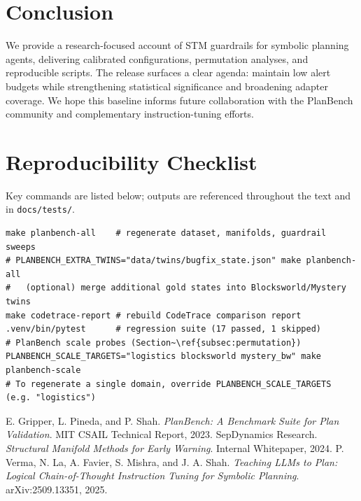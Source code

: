 \documentclass[11pt]{article}
\begin{document}
\section{Conclusion}
We provide a research-focused account of STM guardrails for symbolic planning
agents, delivering calibrated configurations, permutation analyses, and
reproducible scripts. The release surfaces a clear agenda: maintain low alert
budgets while strengthening statistical significance and broadening adapter
coverage. We hope this baseline informs future collaboration with the PlanBench
community and complementary instruction-tuning efforts.

\appendix

\section{Reproducibility Checklist}
Key commands are listed below; outputs are referenced throughout the text and in
\texttt{docs/tests/}.

\begin{lstlisting}[style=stm]
make planbench-all    # regenerate dataset, manifolds, guardrail sweeps
# PLANBENCH_EXTRA_TWINS="data/twins/bugfix_state.json" make planbench-all
#   (optional) merge additional gold states into Blocksworld/Mystery twins
make codetrace-report # rebuild CodeTrace comparison report
.venv/bin/pytest      # regression suite (17 passed, 1 skipped)
# PlanBench scale probes (Section~\ref{subsec:permutation})
PLANBENCH_SCALE_TARGETS="logistics blocksworld mystery_bw" make planbench-scale
# To regenerate a single domain, override PLANBENCH_SCALE_TARGETS (e.g. "logistics")
\end{lstlisting}

\begin{thebibliography}{9}
 E. Gripper, L. Pineda, and P. Shah. \emph{PlanBench: A Benchmark Suite for Plan Validation}. MIT CSAIL Technical Report, 2023.
 SepDynamics Research. \emph{Structural Manifold Methods for Early Warning}. Internal Whitepaper, 2024.
 P. Verma, N. La, A. Favier, S. Mishra, and J. A. Shah. \emph{Teaching LLMs to Plan: Logical Chain-of-Thought Instruction Tuning for Symbolic Planning}. arXiv:2509.13351, 2025.
\end{thebibliography}
\end{document}
